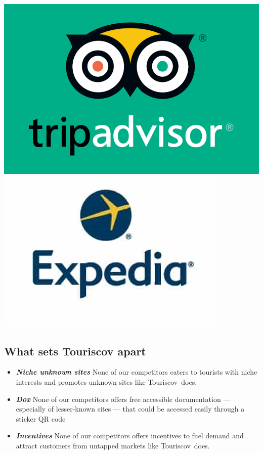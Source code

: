 \documentclass[12pt]{article}
\newcommand{\tco}{Touriscov}
\begin{document}
\begin{minipage}{.5\textwidth}
\begin{flushright}
  \begin{center}
  \vspace{1em}
    \includegraphics[scale=0.2]{tripadvisor-logo.png}
    \includegraphics[scale=0.9]{expedia_logo.jpg}
  \end{center}
  \end{flushright}
\end{minipage}


\subsection{What sets Touriscov apart}
\begin{itemize}
    \item \textbf{\textit{Niche unknown sites}} None of our competitors caters to tourists with niche interests and promotes unknown sites like \tco\ does.
    \item \textbf{\textit{Dox}} None of our competitors offers free accessible documentation --- especially of lesser-known sites --- that could be accessed easily through a sticker QR code
    \item \textbf{\textit{Incentives}} None of our competitors offers incentives to fuel demand and attract customers from untapped markets like \tco\ does.
\end{itemize}
\end{document}
